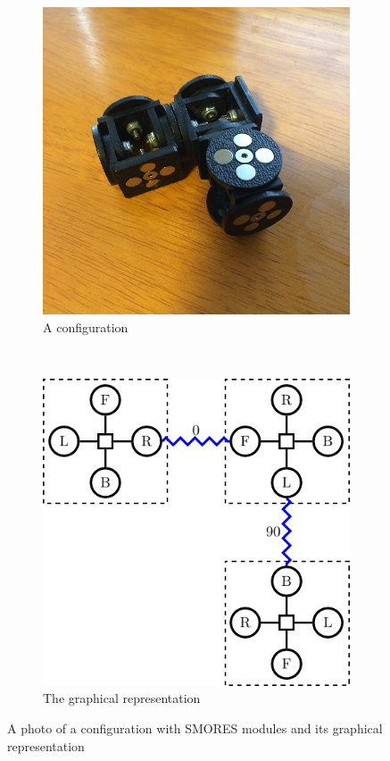 \documentclass[conference]{IEEEtran}
\theoremstyle{definition}
\begin{document}
\begin{figure}
\begin{center}
	\begin{subfigure}[b]{0.4\columnwidth}
		\includegraphics[width=\textwidth]{images/smores_conf.JPG}
		\caption{A configuration}
		\label{fig:smores_conf_photo}
           \end{subfigure}
           ~
	\begin{subfigure}[b]{0.4\columnwidth}
           	\includegraphics[width=\textwidth]{images/tikz/smores_conf.pdf}
           	\caption{The graphical representation}
           	\label{fig:smores_conf_graph}
	\end{subfigure}
\end{center}
\caption{A photo of a configuration with SMORES modules and its graphical representation}
\label{fig:smores_conf}
\end{figure}
\end{document}
